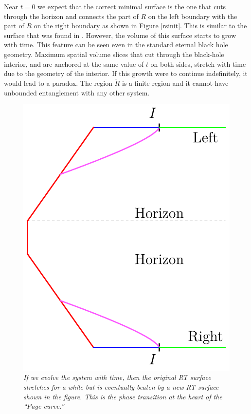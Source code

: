 \documentclass[12pt]{article}
\begin{document}
Near $t = 0$ we expect that the correct minimal surface is the one that cuts through the horizon and connects the part of $R$ on the left boundary with the part of $R$ on the right boundary as shown in Figure \ref{rsinit}. This is similar to the surface that was found in \cite{Hartman:2013qma}. However, the volume of this surface starts to grow with time. This feature can be seen even in the standard eternal black hole geometry. Maximum spatial volume slices that cut through the black-hole interior, and are anchored at the same value of $t$ on both sides, stretch with time due to the geometry of the interior. If this growth were to continue indefinitely, it would lead to a paradox. The region $\widetilde{R}$ is a finite region and it cannot have unbounded entanglement with any other system.  

\begin{figure}[!ht]
\begin{center}
\includegraphics[height=0.4\textheight]{rtisland.pdf}
\caption{\em If we evolve the system with time, then the original RT surface stretches for a while but is eventually beaten by a new RT surface shown in the figure. This is the phase transition at the heart of the ``Page curve.'' \label{rtisland}}
\end{center}
\end{figure}
\end{document}
